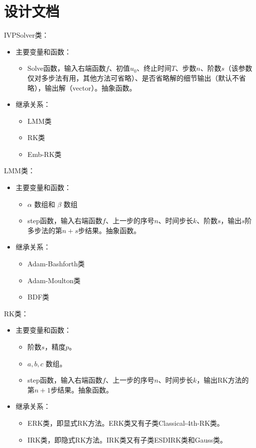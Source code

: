 \documentclass{ctexart}
\begin{document}
\section{设计文档}
	IVPSolver类：
	\begin{itemize}
		\item 主要变量和函数：
		\begin{itemize}
			\item Solve函数，输入右端函数$f$、初值$u_0$、终止时间$T$、步数$n$、阶数$s$（该参数仅对多步法有用，其他方法可省略）、是否省略解的细节输出（默认不省略），输出解（vector）。抽象函数。
		\end{itemize}
		\item 继承关系：
		\begin{itemize}
			\item LMM类
			\item RK类
			\item Emb-RK类
		\end{itemize}
	\end{itemize}

	LMM类：
	\begin{itemize}
		\item 主要变量和函数：
		\begin{itemize}
			\item $\alpha$ 数组和 $\beta$ 数组
			\item step函数，输入右端函数$f$、上一步的序号$n$、时间步长$k$、阶数$s$，输出$s$阶多步法的第$n+s$步结果。抽象函数。
		\end{itemize}
		\item 继承关系：
		\begin{itemize}
			\item Adam-Bashforth类
			\item Adam-Moulton类
			\item BDF类
		\end{itemize}
	\end{itemize}
	
	RK类：
	\begin{itemize}
		\item 主要变量和函数：
		\begin{itemize}
			\item 阶数$s$，精度$p$。
			\item $a,b,c$ 数组。
			\item step函数，输入右端函数$f$、上一步的序号$n$、时间步长$k$，输出RK方法的第$n+1$步结果。抽象函数。
		\end{itemize}
		\item 继承关系：
		\begin{itemize}
			\item ERK类，即显式RK方法。ERK类又有子类Classical-4th-RK类。
			\item IRK类，即隐式RK方法。IRK类又有子类ESDIRK类和Gauss类。
		\end{itemize}
	\end{itemize}
\end{document}
